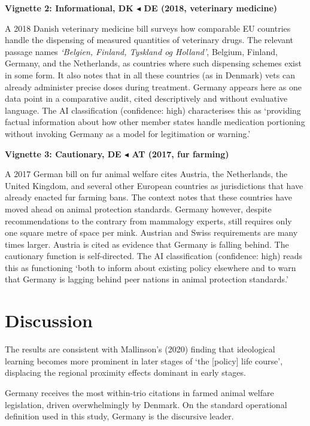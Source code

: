 \documentclass[twocolumn, 10pt, a4paper]{article}
\begin{document}
\noindent\textbf{Vignette 2: Informational, DK $\blacktriangleleft$ DE (2018, veterinary medicine)}

A 2018 Danish veterinary medicine bill surveys how comparable EU countries handle
the dispensing of measured quantities of veterinary drugs. The relevant passage names
\textit{`Belgien, Finland, Tyskland og Holland'}, Belgium, Finland, Germany, and the
Netherlands, as countries where such dispensing schemes exist in some form. It also
notes that in all these countries (as in Denmark) vets can already administer precise
doses during treatment. Germany appears here as one data point in a comparative
audit, cited descriptively and without evaluative language. The AI classification
(confidence: high) characterises this as `providing factual information about how
other member states handle medication portioning without invoking Germany as a model
for legitimation or warning.'

\noindent\textbf{Vignette 3: Cautionary, DE $\blacktriangleleft$ AT (2017, fur farming)}

A 2017 German bill on fur animal welfare cites Austria, the Netherlands, the United
Kingdom, and several other European countries as jurisdictions that have already
enacted fur farming bans. The context notes that these countries have moved ahead on
animal protection standards. Germany however, despite recommendations to the contrary
from mammalogy experts, still requires only one square metre of space per mink.
Austrian and Swiss requirements are many times larger. Austria is cited as evidence
that Germany is falling behind. The cautionary function is self-directed. The AI
classification (confidence: high) reads this as functioning `both to inform about
existing policy elsewhere and to warn that Germany is lagging behind peer nations in
animal protection standards.'

\section{Discussion}

The results are consistent with Mallinson's (2020) finding that ideological learning
becomes more prominent in later stages of `the [policy] life course', displacing the
regional proximity effects dominant in early stages.

Germany receives the most within-trio citations in farmed animal welfare legislation,
driven overwhelmingly by Denmark. On the standard operational definition used in this
study, Germany is the discursive leader.
\end{document}
